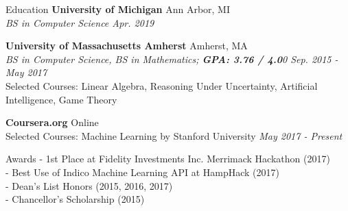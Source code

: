 \documentclass{resume} %
\begin{document}
	
	

	\begin{rSection}{Education}
		{\bf University of Michigan} \hfill {Ann Arbor, MI} \\ 
		\textit{BS in Computer Science \hfill {Apr. 2019}}
		
		{\bf University of Massachusetts Amherst} \hfill {Amherst, MA} \\ 
		\textit{BS in Computer Science, BS in Mathematics; \textbf{GPA: 3.76 / 4.0}0 \hfill {Sep. 2015 - May 2017} }\\
		Selected Courses: Linear Algebra, Reasoning Under Uncertainty, Artificial Intelligence, Game Theory
		
		\textbf{Coursera.org} \hfill {Online} \\ 
		Selected Courses: Machine Learning by Stanford University \hfill {\textit{May 2017 - Present}}
	\end{rSection}
	
	
	\begin{rSection}{Awards}
		- 1st Place at Fidelity Investments Inc. Merrimack Hackathon (2017) \\
		- Best Use of Indico Machine Learning API at HampHack (2017) \\
		- Dean's List Honors (2015, 2016, 2017) \\
		- Chancellor's Scholarship (2015)
	\end{rSection}
	
	
\end{document}
